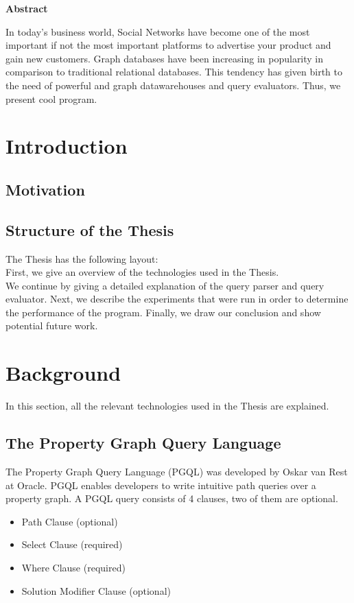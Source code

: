 \documentclass[11pt,singlecolumn]{scrartcl}
\begin{document}
\hspace{60mm}
\begin{center}
 \textbf{Abstract} \end{center}
In today's business world, Social Networks have become one of the most important if not the most important platforms to advertise your product and gain new customers. Graph databases have been increasing in popularity in comparison to traditional relational databases. This tendency has given birth to the need of powerful and graph datawarehouses and query evaluators. Thus, we present cool program.


\clearpage
\tableofcontents
\clearpage
\section{Introduction}
\subsection{Motivation}
\subsection{Structure of the Thesis}
The Thesis has the following layout:\\
First, we give an overview of the technologies used in the Thesis.\\
We continue by giving a detailed explanation of the query parser and query evaluator. Next, we describe the experiments that were run in order to determine the performance of the program. Finally, we draw our conclusion and show potential future work.
\clearpage

\section{Background}
In this section, all the relevant technologies used in the Thesis are explained.
\subsection{The Property Graph Query Language}

The Property Graph Query Language (PGQL) was developed by Oskar van Rest at Oracle. \cite{vanRest:2016} PGQL enables developers to write intuitive path queries over a property graph. A PGQL query consists of 4 clauses, two of them are optional.
\begin{itemize} 
\item Path Clause (optional)
\item Select Clause (required)
\item Where Clause (required)
\item Solution Modifier Clause (optional)
\end{itemize}
\end{document}
